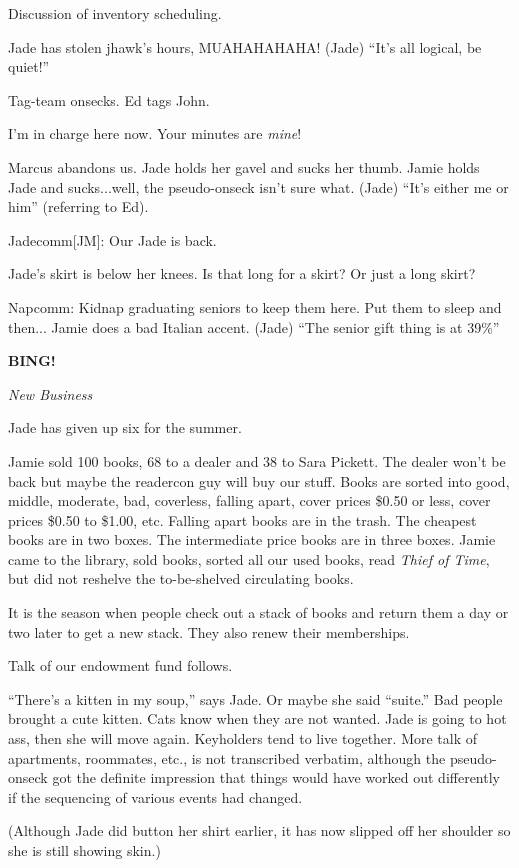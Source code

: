 \documentclass[12pt]{article}
\newcommand{\bing}{{\bf BING!} }
\newcommand{\goto}[1]{\bing \vskip 12pt \centerline{{\em{#1}}}}
\begin{document}
Discussion of inventory scheduling.

Jade has stolen jhawk's hours, MUAHAHAHAHA!  (Jade)  ``It's all logical, be quiet!''

Tag-team onsecks.  Ed tags John.

I'm in charge here now.  Your minutes are {\em mine}!

Marcus abandons us.  Jade holds her gavel and sucks her thumb.
Jamie holds Jade and sucks...well, the pseudo-onseck isn't sure what.
(Jade) ``It's either me or him'' (referring to Ed).

Jadecomm[JM]: Our Jade is back.

Jade's skirt is below her knees.  Is that long for a skirt?  Or just a
long skirt?

Napcomm: Kidnap graduating seniors to keep them here.  Put them
to sleep and then...  Jamie does a bad Italian accent.
(Jade) ``The senior gift thing is at 39\%''


\goto{New Business}

Jade has given up six for the summer.

Jamie sold 100 books, 68 to a dealer and 38 to Sara Pickett.  The
dealer won't be back but maybe the readercon guy will buy our stuff.
Books are sorted into good, middle, moderate, bad, coverless, falling
apart, cover prices \$0.50 or less, cover prices \$0.50 to \$1.00,
etc.  Falling apart books are in the trash.  The cheapest books are in
two boxes.  The intermediate price books are in three boxes.  Jamie
came to the library, sold books, sorted all our used books, read {\em
Thief of Time}, but did not reshelve the to-be-shelved circulating books.

It is the season when people check out a stack of books and return them
a day or two later to get a new stack.  They also renew their memberships.

Talk of our endowment fund follows.

``There's a kitten in my soup,'' says Jade.  Or maybe she said ``suite.''
Bad people brought a cute kitten.  Cats know when they are not wanted.
Jade is going to hot ass, then she will move again.  Keyholders tend to
live together.  More talk of apartments, roommates, etc., is not
transcribed verbatim, although the pseudo-onseck got the definite
impression that things would have worked out differently if the
sequencing of various events had changed.

(Although Jade did button her shirt earlier, it has now slipped off
her shoulder so she is still showing skin.)
\end{document}
